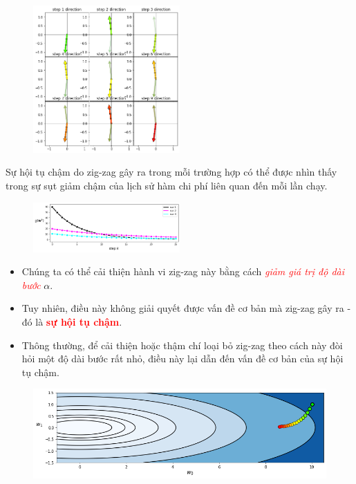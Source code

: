 \documentclass{book}
\begin{document}
\begin{figure}[H]
    \centering
    \includegraphics[width=0.5\textwidth]{images/zig-zag_behaviours_3.png}
\end{figure}
Sự hội tụ chậm do zig-zag gây ra trong mỗi trường hợp có thể được nhìn thấy trong sự sụt giảm chậm của lịch sử hàm chi phí liên quan đến mỗi lần chạy.
\begin{figure}[H]
    \centering
    \includegraphics[width=0.5\textwidth]{images/zig-zag_behaviours_his.png}
\end{figure}
\begin{itemize}
    \item Chúng ta có thể cải thiện hành vi zig-zag này bằng cách \textit{\textcolor{red}{giảm giá trị độ dài bước}} $\alpha$. 
    \item Tuy nhiên, điều này không giải quyết được vấn đề cơ bản mà zig-zag gây ra - đó là \textbf{\textcolor{red}{sự hội tụ chậm}}.  
    \item Thông thường, để cải thiện hoặc thậm chí loại bỏ zig-zag theo cách này đòi hỏi một độ dài bước rất nhỏ, điều này lại dẫn đến vấn đề cơ bản của sự hội tụ chậm.  
\end{itemize}
\begin{figure}[H]
    \centering
    \includegraphics[width=\textwidth]{images/zig-zag_behaviours_contour.png}
\end{figure}
\end{document}
